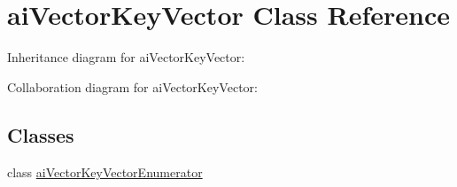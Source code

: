 \hypertarget{classai_vector_key_vector}{\section{ai\+Vector\+Key\+Vector Class Reference}
\label{classai_vector_key_vector}
}


Inheritance diagram for ai\+Vector\+Key\+Vector\+:


Collaboration diagram for ai\+Vector\+Key\+Vector\+:
\subsection*{Classes}
\begin{DoxyCompactItemize}
\item 
class \hyperlink{classai_vector_key_vector_1_1ai_vector_key_vector_enumerator}{ai\+Vector\+Key\+Vector\+Enumerator}
\end{DoxyCompactItemize}
